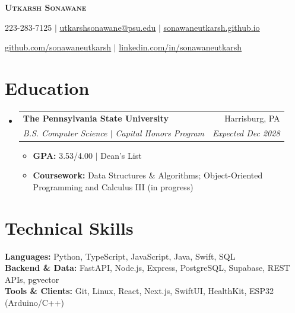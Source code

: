 \documentclass[letterpaper,10pt]{article}
\makeatletter
\newcommand{\resumeItem}[1]{
  \item\small{#1 \vspace{-2pt}}
}
\newcommand{\resumeSubheading}[4]{
  \vspace{-2pt}\item
  \begin{tabular*}{0.98\textwidth}[t]{l@{\extracolsep{\fill}}r}
    \textbf{#1} & #2 \\
    \textit{\small #3} & \textit{\small #4} \\
  \end{tabular*}\vspace{-6pt}
}
\newcommand{\resumeSubHeadingListStart}{
  \begin{itemize}[leftmargin=0.10in, label={}]
}
\newcommand{\resumeSubHeadingListEnd}{
  \end{itemize}
}
\newcommand{\resumeItemListStart}{
  \begin{itemize}[leftmargin=0.15in]
}
\newcommand{\resumeItemListEnd}{
  \end{itemize}\vspace{-6pt}
}
\makeatother
\begin{document}
\begin{center}
  \textbf{\Huge \scshape Utkarsh Sonawane} \\ \vspace{3pt}

  \small
  223-283-7125 $|$
  \href{mailto:utkarshsonawane@psu.edu}
       {\uline{utkarshsonawane@psu.edu}} $|$
  \href{https://sonawaneutkarsh.github.io}
       {\uline{sonawaneutkarsh.github.io}} \\ \vspace{2pt}

  \href{https://github.com/sonawaneutkarsh}
       {\uline{github.com/sonawaneutkarsh}} $|$
  \href{https://linkedin.com/in/sonawaneutkarsh}
       {\uline{linkedin.com/in/sonawaneutkarsh}}
\end{center}

\section{Education}

\resumeSubHeadingListStart

\resumeSubheading
  {The Pennsylvania State University}
  {Harrisburg, PA}
  {B.S. Computer Science $|$ Capital Honors Program}
  {Expected Dec 2028}

\resumeItemListStart
  \resumeItem{
    \textbf{GPA:} 3.53/4.00
    \;$|$\;
    Dean's List
  }
  \resumeItem{
    \textbf{Coursework:}
    Data Structures \& Algorithms; Object-Oriented Programming and Calculus III (in progress)
  }
\resumeItemListEnd

\resumeSubHeadingListEnd

\section{Technical Skills}

\begin{itemize}[leftmargin=0.10in, label={}]
  \small{
    \item{
      \textbf{Languages:}
      Python, TypeScript, JavaScript, Java, Swift, SQL \\

      \textbf{Backend \& Data:}
      FastAPI, Node.js, Express, PostgreSQL, Supabase, REST APIs, pgvector \\

      \textbf{Tools \& Clients:}
      Git, Linux, React, Next.js, SwiftUI, HealthKit, ESP32 (Arduino/C++)
    }
  }
\end{itemize}
\end{document}
